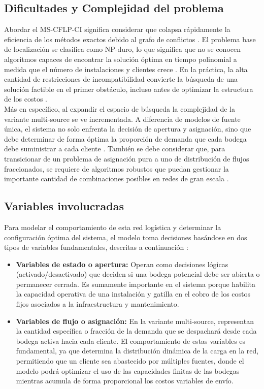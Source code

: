 \documentclass[letter, 10pt]{article}
\begin{document}
\subsection{Dificultades y Complejidad del problema}
Abordar el MS-CFLP-CI significa considerar que colapsa rápidamente la eficiencia de los métodos exactos debido al grafo de conflictos . El problema base de localización se clasifica como NP-duro, lo que significa que no se conocen algoritmos capaces de encontrar la solución óptima en tiempo polinomial a medida que el número de instalaciones y clientes crece . En la práctica, la alta cantidad de restricciones de incompatibilidad convierte la búsqueda de una solución factible en el primer obstáculo, incluso antes de optimizar la estructura de los costos .\\

Más en específico, al expandir el espacio de búsqueda la complejidad de la variante multi-source se ve incrementada. A diferencia de modelos de fuente única, el sistema no solo enfrenta la decisión de apertura y asignación, sino que debe determinar de forma óptima la proporción de demanda que cada bodega debe suministrar a cada cliente \cite{Maia2023}. También se debe considerar que, para transicionar de un problema de asignación pura a uno de distribución de flujos fraccionados, se requiere de algoritmos robustos que puedan gestionar la importante cantidad de combinaciones posibles en redes de gran escala \cite{Gjergji2025}.

\subsection{Variables involucradas}
Para modelar el comportamiento de esta red logística y determinar la configuración óptima del sistema, el modelo toma decisiones basándose en dos tipos de variables fundamentales, descritas a continuación \cite{basu2014}:

\begin{itemize}
    \item \textbf{Variables de estado o apertura:} Operan como decisiones lógicas (activado/desactivado) que deciden si una bodega potencial debe ser abierta o permanecer cerrada. Es sumamente importante en el sistema porque habilita la capacidad operativa de una instalación y gatilla en el cobro de los costos fijos asociados a la infraestructura y mantenimiento.
    \item \textbf{Variables de flujo o asignación:} En la variante multi-source, representan la cantidad específica o fracción de la demanda que se despachará desde cada bodega activa hacia cada cliente. El comportamiento de estas variables es fundamental, ya que determina la distribución dinámica de la carga en la red, permitiendo que un cliente sea abastecido por múltiples fuentes, donde el modelo podrá optimizar el uso de las capacidades finitas de las bodegas mientras acumula de forma proporcional los costos variables de envío.
\end{itemize}
\end{document}
